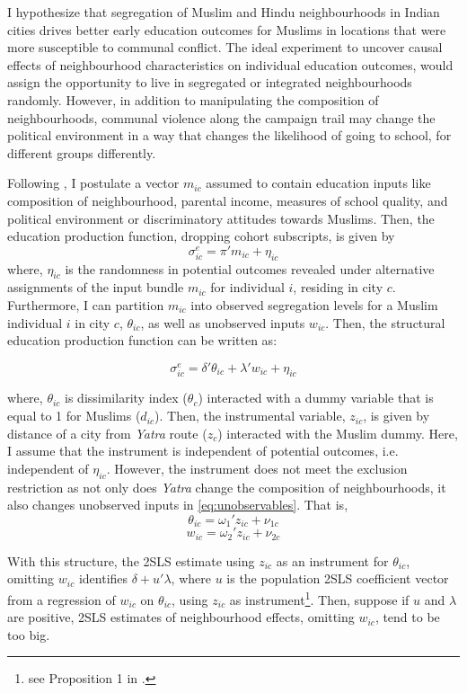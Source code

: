 \documentclass{article}
\begin{document}
I hypothesize that segregation of Muslim and Hindu neighbourhoods in Indian cities drives better early education outcomes for Muslims in locations that were more susceptible to communal conflict. The ideal experiment to uncover causal effects of neighbourhood characteristics on individual education outcomes, would assign the opportunity to live in segregated or integrated neighbourhoods randomly. However, in addition to manipulating the composition of neighbourhoods, communal violence along the campaign trail may change the political environment in a way that changes the likelihood of going to school, for different groups differently. 

Following \cite{abdulkadirouglu2014elite}, I postulate a vector $m_{ic}$ assumed to contain education inputs like composition of neighbourhood, parental income, measures of school quality, and political environment or discriminatory attitudes towards Muslims. Then, the education production function, dropping cohort subscripts, is given by 
$$\sigma_{ic}^e = \pi ' m_{ic} + \eta_{ic}$$
where, $\eta_{ic}$ is the randomness in potential outcomes revealed under alternative assignments of the input bundle $m_{ic}$ for individual $i$, residing in city $c$. Furthermore, I can partition $m_{ic}$ into observed segregation levels for a Muslim individual $i$ in city $c $, $\theta_{ic}$, as well as unobserved inputs $w_{ic}$. Then, the structural education production function can be written as:

\begin{equation}\label{eq:unobservables}
    \sigma_{ic}^e = \delta' \theta_{ic} + \lambda' w_{ic} + \eta_{ic}
\end{equation}

where, $\theta_{ic}$ is dissimilarity index ($\theta_c$) interacted with a dummy variable that is equal to 1 for Muslims ($d_{ic}$). Then, the instrumental variable, $z_{ic}$, is given by distance of a city from \textit{Yatra} route ($z_c$) interacted with the Muslim dummy. Here, I assume that the instrument is independent of potential outcomes, i.e. independent of $\eta_{ic}$. However, the instrument does not meet the exclusion restriction as not only does \textit{Yatra} change the composition of neighbourhoods, it also changes unobserved inputs in \eqref{eq:unobservables}. That is,
$$\theta_{ic} =  \omega_1' z_{ic} + \nu_{1c}$$
$$w_{ic} = \omega_2' z_{ic} + \nu_{2c}$$

With this structure, the 2SLS estimate using $z_{ic}$ as an instrument for $\theta_{ic}$, omitting $w_{ic}$ identifies $\delta + u' \lambda$, where $u$ is the population 2SLS coefficient vector from a regression of $w_{ic}$ on $\theta_{ic}$, using $z_{ic}$ as instrument\footnote{see Proposition 1 in \cite{abdulkadirouglu2014elite}.}. Then, suppose if $u$ and $\lambda$ are  positive, 2SLS estimates of neighbourhood effects, omitting $w_{ic}$, tend to be too big. 
\end{document}
